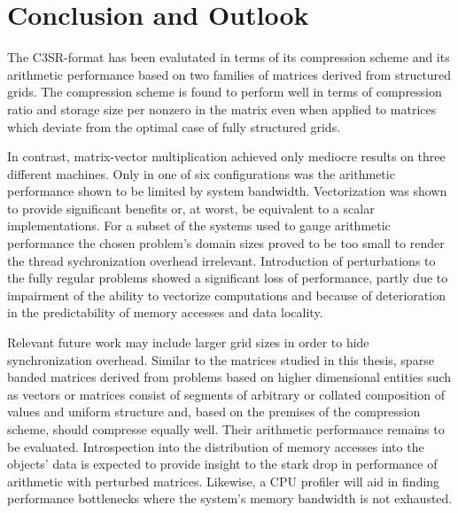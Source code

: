 \chapter{Conclusion and Outlook}

  The C3SR-format has been evalutated in terms of its compression scheme and its arithmetic performance based on two
  families of matrices derived from structured grids. The compression scheme is found to perform well in terms of
  compression ratio and storage size per nonzero in the matrix even when applied to matrices which deviate from the
  optimal case of fully structured grids.

  In contrast, matrix-vector multiplication achieved only mediocre results on three different machines. Only in one of
  six configurations was the arithmetic performance shown to be limited by system bandwidth. Vectorization was shown to
  provide significant benefits or, at worst, be equivalent to a scalar implementations. For a subset of the systems
  used to gauge arithmetic performance the chosen problem's domain sizes proved to be too small to render the thread
  sychronization overhead irrelevant. Introduction of perturbations to the fully regular problems showed a significant
  loss of performance, partly due to impairment of the ability to vectorize computations and because of deterioration in
  the predictability of memory accesses and data locality.

  Relevant future work may include larger grid sizes in order to hide synchronization overhead. Similar to the matrices
  studied in this thesis, sparse banded matrices derived from problems based on higher dimensional entities such as
  vectors or matrices consist of segments of arbitrary or collated composition of values and uniform structure and,
  based on the premises of the compression scheme, should compresse equally well. Their arithmetic performance remains
  to be evaluated. Introspection into the distribution of memory accesses into the objects' data is expected to
  provide insight to the stark drop in performance of arithmetic with perturbed matrices. Likewise, a CPU profiler will
  aid in finding performance bottlenecks where the system's memory bandwidth is not exhausted.
